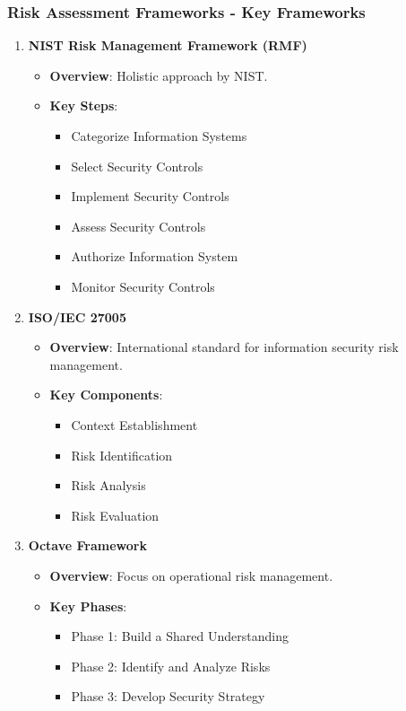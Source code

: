 \documentclass{beamer}
\begin{document}
\begin{frame}[fragile]
    \frametitle{Risk Assessment Frameworks - Key Frameworks}
    \begin{enumerate}
        \item \textbf{NIST Risk Management Framework (RMF)}
        \begin{itemize}
            \item \textbf{Overview}: Holistic approach by NIST.
            \item \textbf{Key Steps}:
            \begin{itemize}
                \item Categorize Information Systems
                \item Select Security Controls
                \item Implement Security Controls
                \item Assess Security Controls
                \item Authorize Information System
                \item Monitor Security Controls
            \end{itemize}
        \end{itemize}
        
        \item \textbf{ISO/IEC 27005}
        \begin{itemize}
            \item \textbf{Overview}: International standard for information security risk management.
            \item \textbf{Key Components}:
            \begin{itemize}
                \item Context Establishment
                \item Risk Identification
                \item Risk Analysis
                \item Risk Evaluation
            \end{itemize}
        \end{itemize}
        
        \item \textbf{Octave Framework}
        \begin{itemize}
            \item \textbf{Overview}: Focus on operational risk management.
            \item \textbf{Key Phases}:
            \begin{itemize}
                \item Phase 1: Build a Shared Understanding
                \item Phase 2: Identify and Analyze Risks
                \item Phase 3: Develop Security Strategy
            \end{itemize}
        \end{itemize}
    \end{enumerate}
\end{frame}
\end{document}
